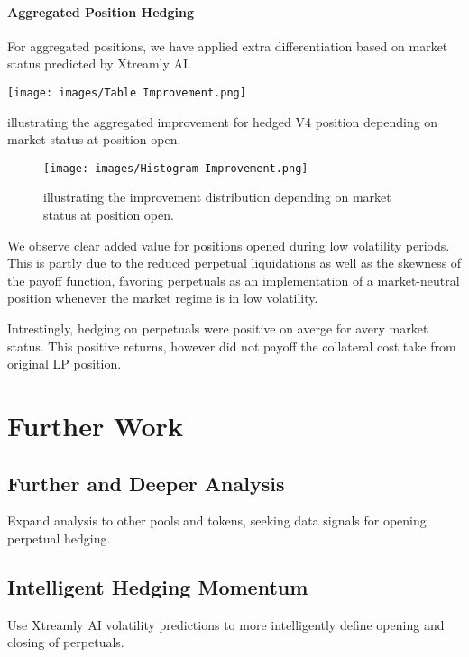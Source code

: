 \documentclass[12pt]{article}
\begin{document}
\paragraph{Aggregated Position Hedging}
For aggregated positions, we have applied extra differentiation based on market status predicted by Xtreamly AI.

\begin{table}[htb]
	\centering
	\texttt{[image: images/Table Improvement.png]}
	\caption{illustrating the aggregated improvement for hedged V4 position depending on market status at position open.}
	\label{fig:Agr}
\end{table}

\begin{figure}[htb]
	\centering
	\texttt{[image: images/Histogram Improvement.png]}
	\caption{illustrating the improvement distribution depending on market status at position open.}
	\label{fig:HistImprov}
\end{figure}

We observe clear added value for positions opened during low volatility periods. This is partly due to the reduced perpetual liquidations as well as the skewness of the payoff function, favoring perpetuals as an implementation of a market-neutral position whenever the market regime is in low volatility.

\medskip

Intrestingly, hedging on perpetuals were positive on averge for avery market status. This positive returns, however did not payoff the collateral cost take from original LP position.

\newpage

\section{Further Work}
\label{sec:futurework}

\subsection{Further and Deeper Analysis}
Expand analysis to other pools and tokens, seeking data signals for opening perpetual hedging.

\subsection{Intelligent Hedging Momentum}
Use Xtreamly AI volatility predictions to more intelligently define opening and closing of perpetuals.
\end{document}
